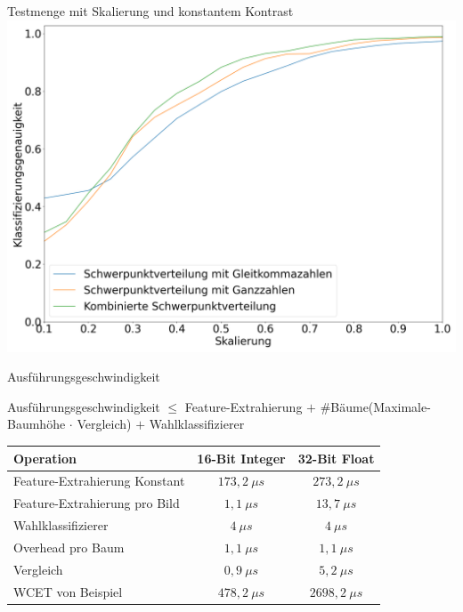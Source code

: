 \documentclass[10pt]{beamer}
\begin{document}
\begin{frame}{Testmenge mit Skalierung und konstantem Kontrast}
    \includegraphics[width=\linewidth]{brightness2_scaling.png}
\end{frame}

\begin{frame}{Ausführungsgeschwindigkeit}
\begin{center}
Ausführungsgeschwindigkeit $\leq$ Feature-Extrahierung $+$ \#Bäume(Maximale-Baumhöhe $\cdot$ Vergleich) $+$ Wahlklassifizierer
\end{center}
\vspace*{0.5cm}
\centering
\begin{tabular}{|l|c|c|}
    \hline
    Operation & 16-Bit Integer & 32-Bit Float \\\hline
    Feature-Extrahierung Konstant & $173,2~\mu s$ & $273,2~\mu s$ \\\hline
    Feature-Extrahierung pro Bild & $1,1~\mu s$ & $13,7~\mu s$ \\\hline
    Wahlklassifizierer & $4~\mu s$ & $4~\mu s$ \\\hline
    Overhead pro Baum & $1,1~\mu s$ & $1,1~\mu s$ \\\hline
    Vergleich & $0,9~\mu s$ & $5,2~\mu s$ \\\hline
    WCET von Beispiel & $478,2~\mu s$ & $2698,2~\mu s$ \\\hline
\end{tabular}
\end{frame}
\end{document}
